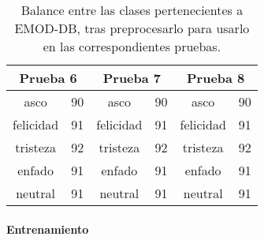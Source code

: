 \documentclass[11pt,a4paper,spanish]{book}
\begin{document}
	\begin{table}[H]
		\centering
		\begin{center}
			\begin{tabular}{ c  c | c  c |c  c }
				\multicolumn{2}{c|}{Prueba 6} &
				\multicolumn{2}{|c|}{Prueba 7} &
				\multicolumn{2}{|c}{Prueba 8} \\
				\hline
				asco 		& 90 & asco 	& 90 & asco 	  & 90\\
				felicidad 	& 91 & felicidad & 91 & felicidad & 91\\
				tristeza 	& 92 & tristeza & 92 & tristeza   & 92\\
				enfado 		& 91 & enfado 	& 91 & enfado 	  & 91\\
				neutral 	& 91 & neutral 	& 91 & neutral 	  & 91\\
				\hline
			\end{tabular}
			
			\caption{Balance entre las clases pertenecientes a EMOD-DB, tras preprocesarlo para usarlo en las correspondientes pruebas.}
			\label{ref:balanceTest678}
		\end{center}
	\end{table}
	
	\paragraph{Entrenamiento}
\end{document}
